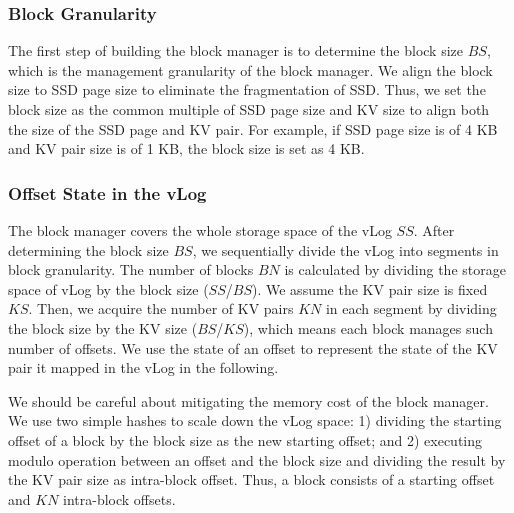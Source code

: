 \documentclass[sigconf]{acmart}
\begin{document}
\subsubsection{Block Granularity}
The first step of building the block manager is to determine the block size $BS$, which is the management granularity of the block manager. We align the block size to SSD page size to eliminate the fragmentation of SSD. Thus, we set the block size as the common multiple of SSD page size and KV size to align both the size of the SSD page and KV pair. For example, if SSD page size is of 4 KB and KV pair size is of 1 KB, the block size is set as 4 KB. 

\subsubsection{Offset State in the vLog}
The block manager covers the whole storage space of the vLog $SS$. After determining the block size $BS$, we sequentially divide the vLog into segments in block granularity. The number of blocks $BN$ is calculated by dividing the storage space of vLog by the block size ($SS$/$BS$). We assume the KV pair size is fixed $KS$. Then, we acquire the number of KV pairs $KN$ in each segment by dividing the block size by the KV size ($BS$/$KS$), which means each block manages such number of offsets. We use the state of an offset to represent the state of the KV pair it mapped in the vLog in the following.

We should be careful about mitigating the memory cost of the block manager. We use two simple hashes to scale down the vLog space: 1) dividing the starting offset of a block by the block size as the new starting offset; and 2) executing modulo operation between an offset and the block size and dividing the result by the KV pair size as intra-block offset. Thus, a block consists of a starting offset and $KN$ intra-block offsets.
\end{document}
